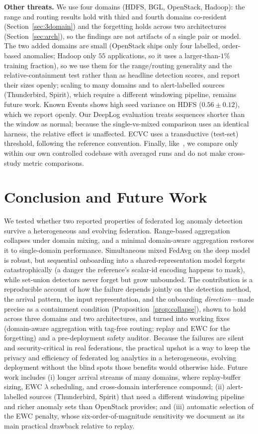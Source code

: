 \documentclass[journal]{IEEEtran}
\begin{document}
\textbf{Other threats.} We use four domains (HDFS, BGL, OpenStack, Hadoop): the range and routing
results hold with third and fourth domains co-resident (Section~\ref{sec:3domain}) and the forgetting
holds across two architectures (Section~\ref{sec:arch}), so the findings are not artifacts of a single
pair or model. The two added domains are small (OpenStack ships only four labelled, order-based
anomalies; Hadoop only $55$ applications, so it uses a larger-than-$1\%$ training fraction), so we use
them for the range/routing generality and the relative-containment test rather than as headline
detection scores, and report their sizes openly; scaling to many domains and to alert-labelled sources
(Thunderbird, Spirit), which require a different windowing pipeline, remains future work. Known Events shows high seed
variance on HDFS ($0.56\pm0.12$), which we report openly. Our DeepLog evaluation treats sequences
shorter than the window as normal; because the single-vs-mixed comparison uses an identical harness,
the relative effect is unaffected. ECVC uses a transductive (test-set) threshold, following the
reference convention. Finally, like~\cite{pustozerova2026lightweight}, we compare only within our own
controlled codebase with averaged runs and do not make cross-study metric comparisons.

\section{Conclusion and Future Work}
We tested whether two reported properties of federated log anomaly detection survive a heterogeneous
and evolving federation. Range-based aggregation collapses under domain mixing, and a minimal
domain-aware aggregation restores it to single-domain performance. Simultaneous mixed FedAvg on the
deep model is robust, but sequential onboarding into a shared-representation model forgets
catastrophically (a danger the reference's scalar-id encoding happens to mask), while set-union
detectors never forget but grow unbounded. The contribution is a reproducible account of how the failure depends jointly on the detection method,
the arrival pattern, the input representation, and the onboarding \emph{direction}---made precise as a
containment condition (Proposition~\ref{prop:collapse}), shown to hold across three domains and two
architectures, and turned into working fixes (domain-aware aggregation with tag-free routing; replay
and EWC for the forgetting) and a pre-deployment safety auditor. Because the failures are silent and
security-critical in real federations, the practical upshot is a way to keep the privacy and efficiency
of federated log analytics in a heterogeneous, evolving deployment without the blind spots those
benefits would otherwise hide. Future work includes (i) longer arrival streams of many domains, where
replay-buffer sizing, EWC $\lambda$ scheduling, and cross-domain interference compound; (ii)
alert-labelled sources (Thunderbird, Spirit) that need a different windowing pipeline and richer anomaly
sets than OpenStack provides; and (iii) automatic selection of the EWC penalty, whose
six-order-of-magnitude sensitivity we document as its main practical drawback relative to replay.
\end{document}
